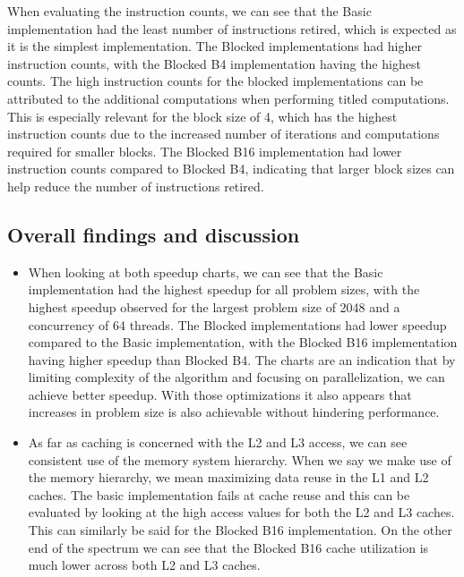 When evaluating the instruction counts, we can see that the Basic implementation had the least number of instructions retired, which is expected as it is the simplest implementation. The Blocked implementations had higher instruction counts, with the Blocked B4 implementation having the highest counts. The high instruction counts for the blocked implementations can be attributed to the additional computations when performing titled computations.\cite{bethel_lecture_14} This is especially relevant for the block size of 4, which has the highest instruction counts due to the increased number of iterations and computations required for smaller blocks. The Blocked B16 implementation had lower instruction counts compared to Blocked B4, indicating that larger block sizes can help reduce the number of instructions retired.

\subsection{Overall findings and discussion}

\begin{itemize}
    \item When looking at both speedup charts, we can see that the Basic implementation had the highest speedup for all problem sizes, with the highest speedup observed for the largest problem size of 2048 and a concurrency of 64 threads. The Blocked implementations had lower speedup compared to the Basic implementation, with the Blocked B16 implementation having higher speedup than Blocked B4. The charts are an indication that by limiting complexity of the algorithm and focusing on parallelization, we can achieve better speedup. With those optimizations it also appears that increases in problem size is also achievable without hindering performance.
    \item As far as caching is concerned with the L2 and L3 access, we can see consistent use of the memory system hierarchy. When we say we make use of the memory hierarchy, we mean maximizing data reuse in the L1 and L2 caches. The basic implementation fails at cache reuse and this can be evaluated by looking at the high access values for both the L2 and L3 caches. This can similarly be said for the Blocked B16 implementation. On the other end of the spectrum we can see that the Blocked B16 cache utilization is much lower across both L2 and L3 caches.\cite{bethel_lecture_14}

\end{itemize}
